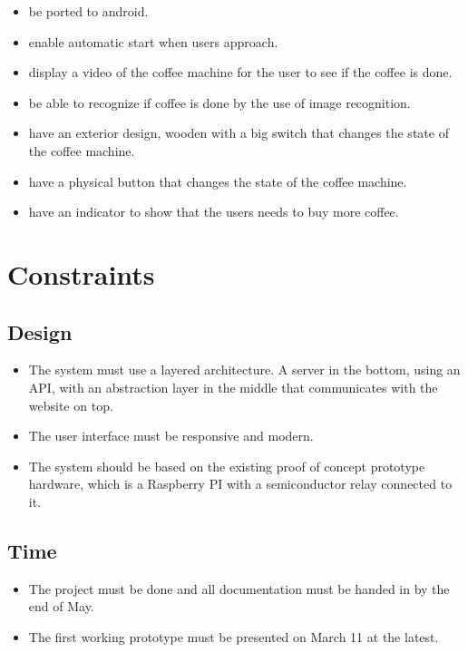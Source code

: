 \begin{itemize}
\item be ported to android.
\item enable automatic start when users approach.
\item display a video of the coffee machine for the user to see if the coffee is done.
\item be able to recognize if coffee is done by the use of image recognition.
\item have an exterior design, wooden with a big switch that changes the state of the coffee machine.
\item have a physical button that changes the state of the coffee machine.
\item have an indicator to show that the users needs to buy more coffee.
\end{itemize}

\section{Constraints}

\subsection{Design}

\begin{itemize}
\item The system must use a layered architecture. A server in the bottom, using an API, with an abstraction layer in the middle that communicates with the website on top.
\item The user interface must be responsive and modern.
\item The system should be based on the existing proof of concept prototype hardware, which is a Raspberry PI with a semiconductor relay connected to it.
\end{itemize}

\subsection{Time}

\begin{itemize}
\item The project must be done and all documentation must be handed in by the end of May.
\item The first working prototype must be presented on March 11 at the latest.
\end{itemize}

